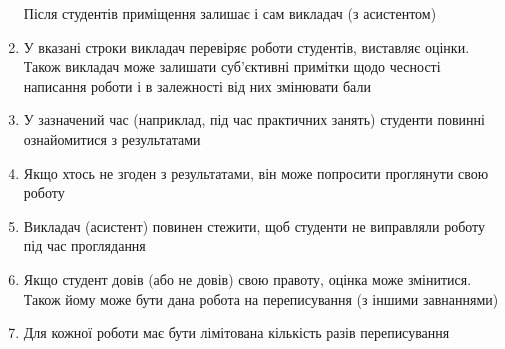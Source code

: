 \begin{enumerate}
        Після студентів приміщення залишає і сам викладач (з асистентом)
    \item
        У вказані строки викладач перевіряє роботи студентів, виставляє оцінки.
        Також викладач може залишати суб’єктивні примітки щодо чесності
        написання роботи і в залежності від них змінювати бали
    \item
        У зазначений час (наприклад, під час практичних занять) студенти повинні
        ознайомитися з результатами
    \item
        Якщо хтось не згоден з результатами, він може попросити проглянути свою
        роботу
    \item
        Викладач (асистент) повинен стежити, щоб студенти не виправляли роботу
        під час проглядання
    \item
        Якщо студент довів (або не довів) свою правоту, оцінка може змінитися.
        Також йому може бути дана робота на переписування (з іншими завнаннями)
    \item
        Для кожної роботи має бути лімітована кількість разів переписування
\end{enumerate}
